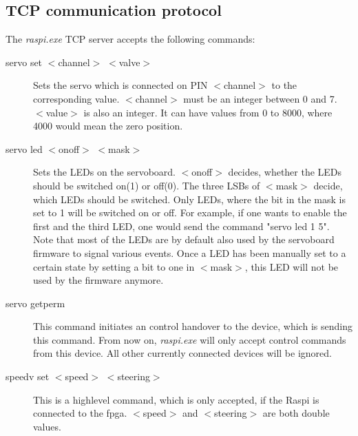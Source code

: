 \documentclass[a4paper
               ,10pt
               ,DIV=10 %
               ,BCOR=0.3cm
               ,pagesize %
               ,headings=small
               ,bibtotoc
               ]
               {scrartcl}
\begin{document}
\subsection{TCP communication protocol}
The \textit{raspi.exe} TCP server accepts the following commands:
\begin{description}
\item[servo set $<$channel$>$ $<$valve$>$] Sets the servo which is connected on PIN $<$channel$>$ to the corresponding value. $<$channel$>$ must be an integer between 0 and 7. $<$value$>$ is also an integer. It can have values from 0 to 8000, where 4000 would mean the zero position.
\item[servo led $<$onoff$>$ $<$mask$>$] Sets the LEDs on the servoboard. $<$onoff$>$ decides, whether the LEDs should be switched on(1) or off(0). The three LSBs of $<$mask$>$ decide, which LEDs should be switched. Only LEDs, where the bit in the mask is set to 1 will be switched on or off. For example, if one wants to enable the first and the third LED, one would send the command "servo led 1 5". Note that most of the LEDs are by default also used by the servoboard firmware to signal various events. Once a LED has been manually set to a certain state by setting a bit to one in $<$mask$>$, this LED will not be used by the firmware anymore.
\item[servo getperm] This command initiates an control handover to the device, which is sending this command. From now on, \textit{raspi.exe} will only accept control commands from this device. All other currently connected devices will be ignored.
\item[speedv set $<$speed$>$ $<$steering$>$] This is a highlevel command, which is only accepted, if the Raspi is connected to the fpga. $<$speed$>$ and $<$steering$>$ are both double values.
\end{description}
\end{document}
